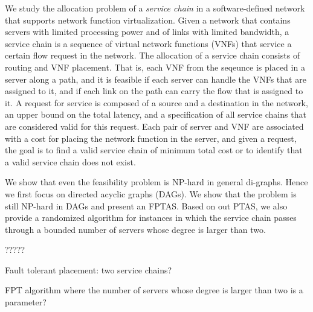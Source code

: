 
We study the allocation problem of a \emph{service chain} in a
software-defined network that supports network function
virtualization.
%
Given a network that contains servers with limited processing power
and of links with limited bandwidth, a service chain is a sequence of
virtual network functions (VNFs) that service a certain flow request
in the network.
%
The allocation of a service chain consists of routing and VNF
placement.  That is, each VNF from the seqeunce is placed in a server
along a path, and it is feasible if each server can handle the VNFs
that are assigned to it, and if each link on the path can carry the
flow that is assigned to it.
%
A request for service is composed of a source and a destination in the
network, an upper bound on the total latency, and a specification of
all service chains that are considered valid for this request.
%
Each pair of server and VNF are associated with a cost for placing the
network function in the server, and given a request, the goal is to
find a valid service chain of minimum total cost or to identify that
a valid service chain does not exist.

We show that even the feasibility problem is NP-hard in general
di-graphs.  Hence we first focus on directed acyclic graphs (DAGs).
We show that the problem is still NP-hard in DAGs and present an
FPTAS.
%
Based on out PTAS, we also provide a randomized algorithm for
instances in which the service chain passes through a bounded number
of servers whose degree is larger than two.

?????

Fault tolerant placement: two service chains?

FPT algorithm where the number of servers whose degree is larger than
two is a parameter?
